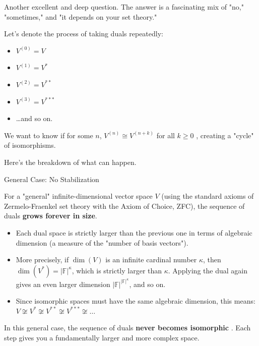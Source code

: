 \documentclass[aps,preprint]{revtex4}
\newenvironment{answer}
  {\begin{tcolorbox}[colback=green!5!white,colframe=green!75!black,title=Answer]}
  {\end{tcolorbox}}
\begin{document}
\begin{answer}
Another excellent and deep question. The answer is a fascinating mix of
"no," "sometimes," and "it depends on your set theory."

Let's denote the process of taking duals repeatedly:

\begin{itemize}
\item $V^{(0)} = V$

\item $V^{(1)} = V^*$

\item $V^{(2)} = V^{**}$

\item $V^{(3)} = V^{***}$

\item \ldots and so on.
\end{itemize}

We want to know if for some $n$, $V^{(n)} \cong V^{(n+k)}$ for all $k \ge 0$%
, creating a "cycle" of isomorphisms.

Here's the breakdown of what can happen.

General Case: No Stabilization

For a "general" infinite-dimensional vector space $V$ (using the standard
axioms of Zermelo-Fraenkel set theory with the Axiom of Choice, ZFC), the
sequence of duals \textbf{grows forever in size}.

\begin{itemize}
\item Each dual space is strictly larger than the previous one in terms of
algebraic dimension (a measure of the "number of basis vectors").

\item More precisely, if $\dim(V)$ is an infinite cardinal number $\kappa$,
then $\dim(V^*) = |\mathbb{F}|^{\kappa}$, which is strictly larger than $%
\kappa$. Applying the dual again gives an even larger dimension $|\mathbb{F}%
|^{|\mathbb{F}|^{\kappa}}$, and so on.

\item Since isomorphic spaces must have the same algebraic dimension, this
means: $V \not\cong V^* \not\cong V^{**} \not\cong V^{***} \not\cong \dots$
\end{itemize}

In this general case, the sequence of duals \textbf{never becomes isomorphic}%
. Each step gives you a fundamentally larger and more complex space.


\end{answer}
\end{document}
